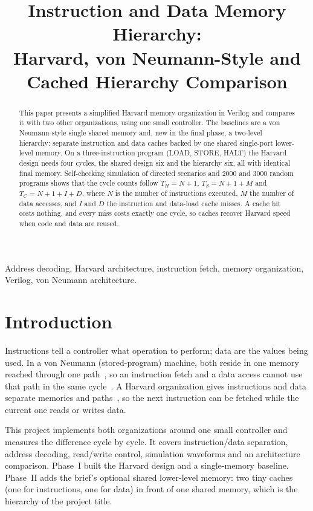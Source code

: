 \documentclass[conference,a4paper]{IEEEtran}
\title{Instruction and Data Memory Hierarchy:\\Harvard, von Neumann-Style and Cached Hierarchy Comparison}
\author{\IEEEauthorblockN{Akshat Chauhan, Ajeesh Amreet, Vaibhav,\\
Hardik Maheshwari and Mitul Bhatia}
\IEEEauthorblockA{Team HEXARCH, Section A --- MCA Project 9, 2026\\
Newton School of Technology, Rishihood University\\
mitul.bhatia2024@nst.rishihood.edu.in}}
\begin{document}
\maketitle

\begin{abstract}
This paper presents a simplified Harvard memory organization in Verilog and
compares it with two other organizations, using one small controller. The
baselines are a von Neumann-style single shared memory and, new in the final
phase, a two-level hierarchy: separate instruction and data caches
backed by one shared single-port lower-level memory. On a
three-instruction program (LOAD, STORE, HALT) the Harvard design needs four
cycles, the shared design six and the hierarchy six, all with identical
final memory. Self-checking simulation of directed scenarios and 2000 and 3000
random programs shows that the cycle counts follow $T_H=N+1$,
$T_S=N+1+M$ and $T_C=N+1+I+D$, where $N$ is the number of instructions
executed, $M$ the number of data accesses, and $I$ and $D$ the instruction
and data-load cache misses. A cache hit costs nothing, and every miss costs
exactly one cycle, so caches recover Harvard speed when code and data are
reused.
\end{abstract}

\begin{IEEEkeywords}
Address decoding, Harvard architecture, instruction fetch, memory
organization, Verilog, von Neumann architecture.
\end{IEEEkeywords}

\section{Introduction}
Instructions tell a controller what operation to perform; data are the
values being used. In a von Neumann (stored-program) machine, both reside
in one memory reached through one path~\cite{vonneumann}, so an
instruction fetch and a data access cannot use that path in the same
cycle~\cite{backus}. A Harvard organization gives instructions and data
separate memories and paths~\cite{aiken}, so the next instruction can be
fetched while the current one reads or writes data.

This project implements both organizations around one small controller
and measures the difference cycle by cycle. It covers instruction/data
separation, address decoding, read/write control, simulation waveforms and
an architecture comparison. Phase~I built the Harvard design and a
single-memory baseline. Phase~II adds the brief's optional shared lower-level
memory: two tiny caches (one for instructions, one for data) in front of one
shared memory, which is the hierarchy of the project title.
\end{document}
